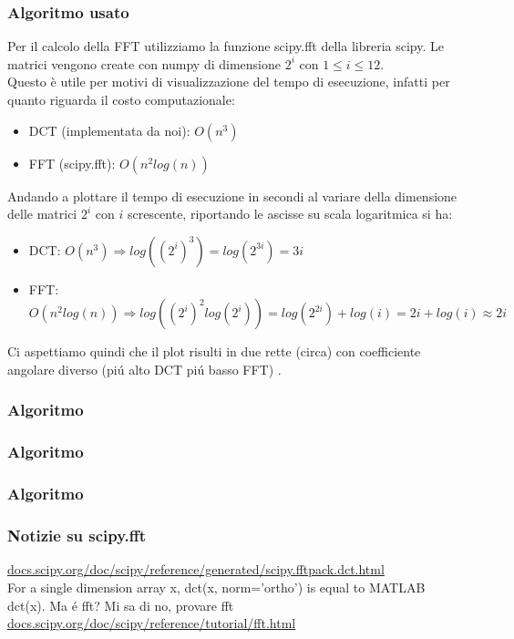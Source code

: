\documentclass{beamer}
\begin{document}
\begin{frame}
\frametitle{Algoritmo usato}
Per il calcolo della FFT utilizziamo la funzione scipy.fft della libreria scipy. Le matrici vengono create con numpy di dimensione $2^i$ con $1\leq i \leq 12$.\\
Questo è utile per motivi di visualizzazione del tempo di esecuzione, infatti per quanto riguarda il costo computazionale:
\begin{itemize}
	\item DCT (implementata da noi): $O(n^3)$
	\item FFT (scipy.fft): $O(n^2log(n))$
\end{itemize}
Andando a plottare il tempo di esecuzione in secondi al variare della dimensione delle matrici $2^i$ con $i$ screscente, riportando le ascisse su scala logaritmica si ha:\\
\begin{itemize}
	\item DCT: $O(n^3) \Rightarrow log((2^i)^3) =  log(2^{3i}) = 3i $
	\item FFT: $O(n^2log(n)) \Rightarrow log((2^i)^2 log(2^i)) =  log(2^{2i}) + log(i) = 2i + log(i) \approx 2i$
\end{itemize}
Ci aspettiamo quindi che il plot risulti in due rette (circa) con coefficiente angolare diverso (pi\'u alto DCT pi\'u basso FFT) .
\end{frame}

\begin{frame}
\frametitle{Algoritmo}
	
\end{frame}

\begin{frame}
\frametitle{Algoritmo}
	
\end{frame}

\begin{frame}
\frametitle{Algoritmo}
	
\end{frame}

\begin{frame}
\frametitle{Notizie su scipy.fft}
\url{docs.scipy.org/doc/scipy/reference/generated/scipy.fftpack.dct.html}\\
	For a single dimension array x, dct(x, norm='ortho') is equal to MATLAB dct(x). Ma \'e fft? Mi sa di no, provare fft
	 \url{docs.scipy.org/doc/scipy/reference/tutorial/fft.html}
\end{frame}
\end{document}
